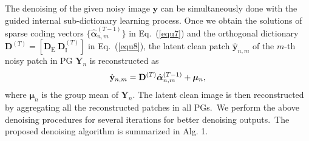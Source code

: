 \documentclass[10pt,twocolumn,letterpaper]{article}
\begin{document}
The denoising of the given noisy image $\mathbf{y}$ can be simultaneously done with the guided internal sub-dictionary learning process. Once we obtain the solutions of sparse coding vectors $\{\hat{\bm{\alpha}}_{n,m}^{(T-1)}\}$ in Eq.\ (\ref{equ7}) and the orthogonal dictionary $\mathbf{D}^{(T)} = [\mathbf{D}_{\text{E}}\ \mathbf{D}_{\text{I}}^{(T)}]$ in Eq.\ (\ref{equ8}), the latent clean patch $\hat{\mathbf{y}}_{n,m}$ of the $m$-th noisy patch in PG $\mathbf{Y}_{n}$ is reconstructed as
\vspace{-2mm}
\begin{equation}\label{equ10}\vspace{-2mm}
\hat{\mathbf{y}}_{n,m}=\mathbf{D}^{(T)}\hat{\bm{\alpha}}_{n,m}^{(T-1)}+\bm{\mu}_{n},
\end{equation}
where $\bm{\mu}_{n}$ is the group mean of $\mathbf{Y}_{n}$. The latent clean image is then reconstructed by aggregating all the reconstructed patches in all PGs.\ We perform the above denoising procedures for several iterations for better denoising outputs.\ The proposed denoising algorithm is summarized in Alg. 1.
\end{document}
